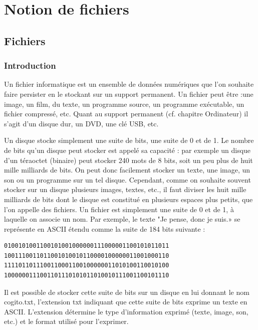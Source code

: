 \documentclass[11pt, a4paper]{book}
\begin{document}
\setcounter{chapter}{2}

\chapter{Notion de fichiers}

\section{Fichiers}
\subsection{Introduction}

Un fichier informatique est un ensemble de données numériques que l'on souhaite faire persister en le stockant sur un support permanent. Un fichier peut être :une image, un film, du texte, un programme source, un programme exécutable, un fichier compressé, etc. Quant au support permanent (cf. chapitre Ordinateur) il s'agit d'un disque dur, un DVD, une clé USB, etc.

Un disque stocke simplement une suite de bits, une suite de 0 et de 1. Le nombre de bits qu’un disque peut stocker est appelé sa capacité : par exemple un disque d’un téraoctet (binaire) peut stocker 240 mots de 8 bits, soit un peu plus de huit mille milliards de bits. On peut donc facilement stocker un texte, une image, un son ou un programme sur un tel disque. Cependant, comme on souhaite souvent stocker sur un disque plusieurs images, textes, etc., il faut diviser les huit mille milliards de bits dont le disque est constitué en plusieurs espaces plus petits, que l’on appelle des fichiers. Un fichier est simplement une suite de 0 et de 1, à laquelle on associe un nom. Par exemple, le texte "Je pense, donc je suis.» se représente en ASCII étendu comme la suite de 184 bits suivante :

\begin{verbatim}
0100101001100101001000000111000001100101011011
1001110011011001010010110000100000011001000110
1111011011100110001100100000011010100110010100
1000000111001101110101011010010111001100101110
\end{verbatim}

Il est possible de stocker cette suite de bits sur un disque en lui donnant le nom cogito.txt, l’extension txt indiquant que cette suite de bits exprime un texte en ASCII. L’extension détermine le type d’information exprimé (texte, image, son, etc.) et le format utilisé pour l’exprimer.
\end{document}
